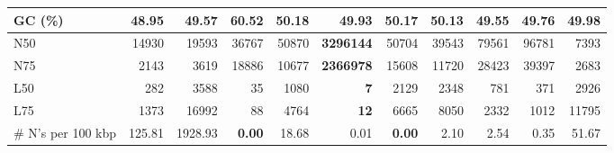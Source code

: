 \documentclass[12pt,a4paper]{article}
\begin{document}
\begin{table}[ht]
\begin{center}
\begin{tabular}{|l*{10}{|r}|}
GC (\%) & 48.95 & 49.57 & 60.52 & 50.18 & 49.93 & 50.17 & 50.13 & 49.55 & 49.76 & 49.98 \\ \hline
N50 & 14930 & 19593 & 36767 & 50870 & {\bf 3296144} & 50704 & 39543 & 79561 & 96781 & 7393 \\ \hline
N75 & 2143 & 3619 & 18886 & 10677 & {\bf 2366978} & 15608 & 11720 & 28423 & 39397 & 2683 \\ \hline
L50 & 282 & 3588 & 35 & 1080 & {\bf 7} & 2129 & 2348 & 781 & 371 & 2926 \\ \hline
L75 & 1373 & 16992 & 88 & 4764 & {\bf 12} & 6665 & 8050 & 2332 & 1012 & 11795 \\ \hline
\# N's per 100 kbp & 125.81 & 1928.93 & {\bf 0.00} & 18.68 & 0.01 & {\bf 0.00} & 2.10 & 2.54 & 0.35 & 51.67 \\ \hline
\end{tabular}
\end{center}
\end{table}
\end{document}
